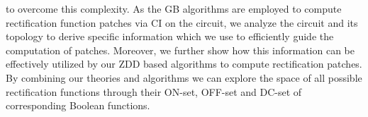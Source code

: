  to overcome
this complexity. As the GB algorithms are employed to compute rectification function
patches via CI on the circuit, we analyze the circuit and its topology to derive specific
information which we use to efficiently guide the computation of patches. Moreover, we
further show how this information can be effectively utilized by our ZDD based algorithms
to compute rectification patches. By combining our theories and algorithms we can explore
the space of all possible rectification functions through their ON-set, OFF-set and DC-set
of corresponding Boolean functions.
